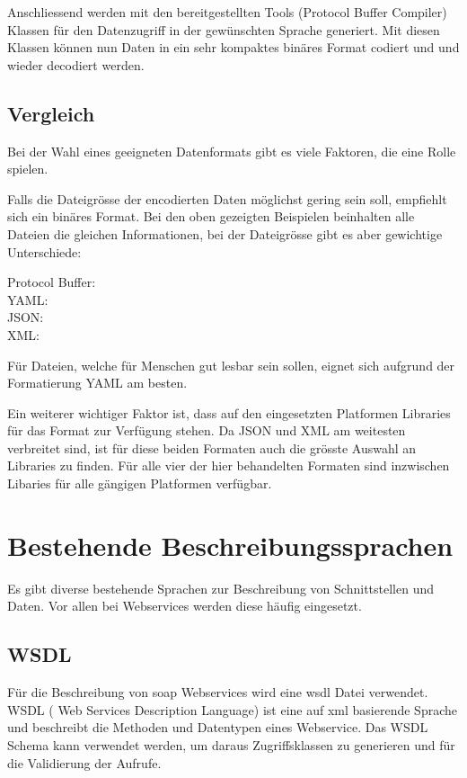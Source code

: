 Anschliessend werden mit den bereitgestellten Tools (Protocol Buffer Compiler) Klassen für den Datenzugriff in der gewünschten Sprache generiert. Mit diesen Klassen können nun Daten in ein sehr kompaktes binäres Format codiert und und wieder decodiert werden.

\subsection{Vergleich}

Bei der Wahl eines geeigneten Datenformats gibt es viele Faktoren, die eine Rolle spielen.

Falls die Dateigrösse der encodierten Daten möglichst gering sein soll, empfiehlt sich ein binäres Format. Bei den oben gezeigten Beispielen beinhalten alle Dateien die gleichen Informationen, bei der Dateigrösse gibt es aber gewichtige Unterschiede:

Protocol Buffer:   \\
YAML:              \\
JSON:              \\
XML:              

Für Dateien, welche für Menschen gut lesbar sein sollen, eignet sich aufgrund der Formatierung YAML am besten. 

Ein weiterer wichtiger Faktor ist, dass auf den eingesetzten Platformen Libraries für das Format zur Verfügung stehen. Da JSON und XML am weitesten verbreitet sind, ist für diese beiden Formaten auch die grösste Auswahl an Libraries zu finden. Für alle vier der hier behandelten Formaten sind inzwischen Libaries für alle gängigen Platformen verfügbar.


\section{Bestehende Beschreibungssprachen}

Es gibt diverse bestehende Sprachen zur Beschreibung von Schnittstellen und Daten. Vor allen bei Webservices werden diese häufig eingesetzt.

\subsection{WSDL}
Für die Beschreibung von \gls{soap} Webservices wird eine \gls{wsdl} Datei verwendet. WSDL ( Web Services Description Language) ist eine auf \gls{xml} basierende Sprache und beschreibt die Methoden und Datentypen eines Webservice. Das WSDL Schema kann verwendet werden, um daraus Zugriffsklassen zu generieren und für die Validierung der Aufrufe.

